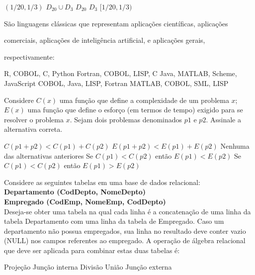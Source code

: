 \documentclass[12pt, addpoints]{exam}
\begin{document}
\begin{questions}
\begin{choices}
\choice \( (1/20, 1/3) \)
\choice \( D_{20} \cup D_3 \)
\choice \( D_{20} \)
\choice \( D_3 \)
\choice \( [1/20, 1/3) \)
\end{choices}

\question

São linguagens clássicas que representam aplicações científicas, aplicações 

comerciais, aplicações de inteligência artificial, e aplicações gerais,

respectivamente:
\begin{choices}
\choice R, COBOL, C, Python
\choice Fortran, COBOL, LISP, C
\choice Java, MATLAB, Scheme, JavaScript
\choice COBOL, Java, LISP, Fortran
\choice MATLAB, COBOL, SML, LISP
\end{choices}

\question

Considere \( C(x) \) uma função que define a complexidade de um problema \( x \); \( E(x) \) uma função que define o esforço (em termos de tempo) exigido para se resolver o problema \( x \). Sejam dois problemas denominados \( p1 \) e \( p2 \). Assinale a alternativa correta.


\begin{choices}
\choice \( C(p1 + p2) < C(p1) + C(p2) \)
\choice \( E(p1 + p2) < E(p1) + E(p2) \)
\choice Nenhuma das alternativas anteriores
\choice Se \( C(p1) < C(p2) \) então \( E(p1) < E(p2) \)
\choice Se \( C(p1) < C(p2) \) então \( E(p1) > E(p2) \)
\end{choices}

\question

Considere as seguintes tabelas em uma base de dados relacional:\\

\textbf{Departamento (CodDepto, NomeDepto)}\\

\textbf{Empregado (CodEmp, NomeEmp, CodDepto)}\\

Deseja-se obter uma tabela na qual cada linha é a concatenação de uma linha da tabela Departamento com uma linha da tabela de Empregado. Caso um departamento não possua empregados, sua linha no resultado deve conter vazio (NULL) nos campos referentes ao empregado. A operação de álgebra relacional que deve ser aplicada para combinar estas duas tabelas é:
\begin{choices}
\choice Projeção
\choice Junção interna
\choice Divisão
\choice União
\choice Junção externa
\end{choices}


\end{questions}
\end{document}

